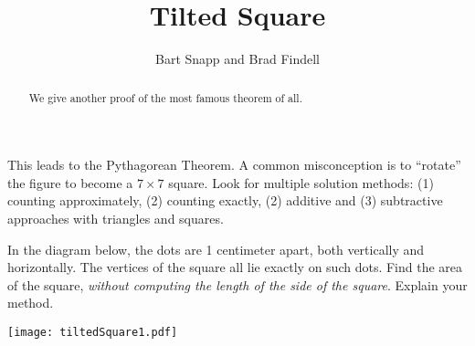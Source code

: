 \documentclass[nooutcomes]{ximera}
\title{Tilted Square}
\author{Bart Snapp and Brad Findell}
\begin{document}
\begin{abstract}
  We give another proof of the most famous theorem of all.
\end{abstract}
\maketitle


\begin{teachingnote}
This leads to the Pythagorean Theorem.  A common misconception is to ``rotate'' the figure to become a $7\times 7$ square.  Look for multiple solution methods:  (1) counting approximately, (2) counting exactly, (2) additive and (3) subtractive approaches with triangles and squares.
\end{teachingnote}

\begin{problem}
In the diagram below, the dots are 1 centimeter apart, both vertically and horizontally.  The vertices of the square all lie exactly on such dots. Find the area of the square, \emph{without computing the length of the side of the square}.  Explain your method.  

\begin{image}
\texttt{[image: tiltedSquare1.pdf]}
\end{image}

\end{problem}
\end{document}
